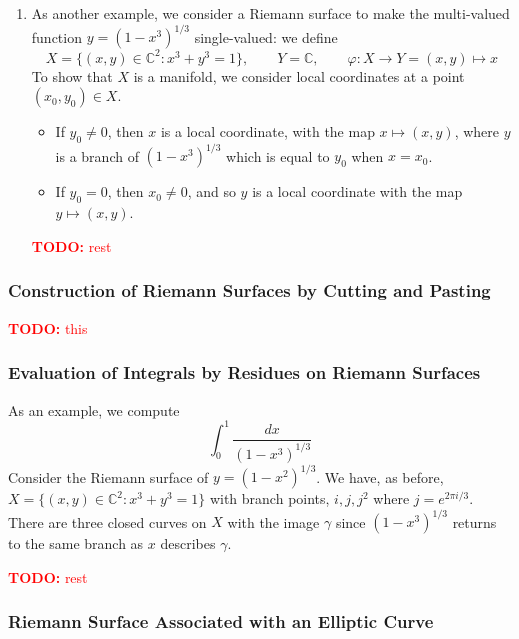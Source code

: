 \documentclass{article}
\newcommand{\mbb}[1]{\mathbb{#1}}
\newcommand{\TODO}[1]{\begin{center}\huge{\textcolor{red}{\textbf{TODO:} #1}}\end{center}}
\begin{document}
\begin{enumerate}
  \item As another example, we consider a Riemann surface to make the multi-valued function \(y = (1 - x^3)^{1/3}\) single-valued: we define
  \begin{equation}
    X = \{(x, y) \in \mbb{C}^2 : x^3 + y^3 = 1\},
    \qquad Y = \mbb{C},
    \qquad \varphi: X \to Y = (x, y) \mapsto x
  \end{equation}
  To show that \(X\) is a manifold, we consider local coordinates at a point \((x_0, y_0) \in X\).
  \begin{itemize}

    \item If \(y_0 \neq 0\), then \(x\) is a local coordinate, with the map \(x \mapsto (x, y)\), where \(y\) is a branch of \((1 - x^3)^{1/3}\) which is equal to \(y_0\) when \(x = x_0\).

    \item If \(y_0 = 0\), then \(x_0 \neq 0\), and so \(y\) is a local coordinate with the map \(y \mapsto (x, y)\).

  \end{itemize}

  \TODO{rest}

\end{enumerate}

\subsubsection{Construction of Riemann Surfaces by Cutting and Pasting}

\TODO{this}

\subsubsection{Evaluation of Integrals by Residues on Riemann Surfaces}

As an example, we compute
\begin{equation}\int_0^1\frac{dx}{(1 - x^3)^{1/3}}\end{equation}
Consider the Riemann surface of \(y = (1 - x^2)^{1/3}\). We have, as before, \(X = \{(x, y) \in \mbb{C}^2 : x^3 + y^3 = 1\}\) with branch points, \(i, j, j^2\) where \(j = e^{2\pi i/3}\). There are three closed curves on \(X\) with the image \(\gamma\) since \((1 - x^3)^{1/3}\) returns to the same branch as \(x\) describes \(\gamma\).

\TODO{rest}

\subsubsection{Riemann Surface Associated with an Elliptic Curve}
\end{document}
